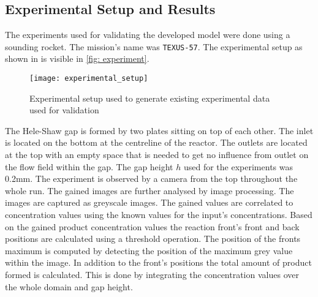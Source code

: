 \documentclass[../thesis.tex]{subfiles}
\begin{document}
\subsection{Experimental Setup and Results}

The experiments used for validating the developed model were done using a sounding rocket. The mission's name was \texttt{TEXUS-57}. The experimental setup as shown in \cite{stergiou2022effects} is visible in \autoref{fig: experiment}.
\begin{figure}[htbp]
	\centering
	\texttt{[image: experimental\_setup]}
	\caption{Experimental setup used to generate existing experimental data used for validation \cite{stergiou2022effects}}
	\label{fig: experiment}
\end{figure}
The Hele-Shaw gap is formed by two plates sitting on top of each other. The inlet is located on the bottom at the centreline of the reactor. The outlets are located at the top with an empty space that is needed to get no influence from outlet on the flow field within the gap. The gap height $h$ used for the experiments was 0.2mm. The experiment is observed by a camera from the top throughout the whole run. The gained images are further analysed by image processing. The images are captured as greyscale images. The gained values are correlated to concentration values using the known values for the input's concentrations. Based on the gained product concentration values the reaction front's front and back positions are calculated using a threshold operation. The position of the fronts maximum is computed by detecting the position of the maximum grey value within the image. In addition to the front's positions the total amount of product formed is calculated. This is done by integrating the concentration values over the whole domain and gap height.

\end{document}
